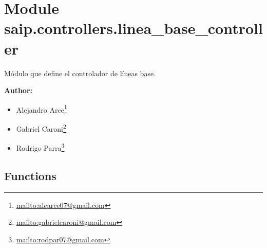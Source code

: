 %
%
%


\section{Module saip.controllers.linea\_base\_controller}

    \label{saip:controllers:linea_base_controller}
Módulo que define el controlador de líneas base.

\textbf{Author:} \begin{itemize}
\setlength{\parskip}{0.6ex}
  \item Alejandro 
    Arce\footnote{\href{mailto:alearce07@gmail.com}{mailto:alearce07@gmail.com}}

  \item Gabriel 
    Caroni\footnote{\href{mailto:gabrielcaroni@gmail.com}{mailto:gabrielcaroni@gmail.com}}

  \item Rodrigo 
    Parra\footnote{\href{mailto:rodpar07@gmail.com}{mailto:rodpar07@gmail.com}}

\end{itemize}





  \subsection{Functions}

    \label{saip:controllers:linea_base_controller:UnificarItem}

    \vspace{0.5ex}

